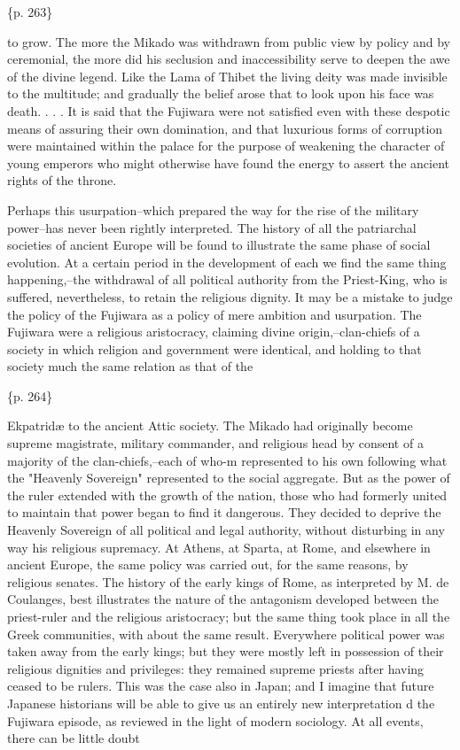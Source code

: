 \{p. 263\}

to grow. The more the Mikado was withdrawn from public view by policy and by ceremonial, the more did his seclusion and inaccessibility serve to deepen the awe of the divine legend. Like the Lama of Thibet the living deity was made invisible to the multitude; and gradually the belief arose that to look upon his face was death. . . . It is said that the Fujiwara were not satisfied even with these despotic means of assuring their own domination, and that luxurious forms of corruption were maintained within the palace for the purpose of weakening the character of young emperors who might otherwise have found the energy to assert the ancient rights of the throne.

Perhaps this usurpation--which prepared the way for the rise of the military power--has never been rightly interpreted. The history of all the patriarchal societies of ancient Europe will be found to illustrate the same phase of social evolution. At a certain period in the development of each we find the same thing happening,--the withdrawal of all political authority from the Priest-King, who is suffered, nevertheless, to retain the religious dignity. It may be a mistake to judge the policy of the Fujiwara as a policy of mere ambition and usurpation. The Fujiwara were a religious aristocracy, claiming divine origin,--clan-chiefs of a society in which religion and government were identical, and holding to that society much the same relation as that of the

\{p. 264\}

Ekpatridæ to the ancient Attic society. The Mikado had originally become supreme magistrate, military commander, and religious head by consent of a majority of the clan-chiefs,--each of who-m represented to his own following what the "Heavenly Sovereign" represented to the social aggregate. But as the power of the ruler extended with the growth of the nation, those who had formerly united to maintain that power began to find it dangerous. They decided to deprive the Heavenly Sovereign of all political and legal authority, without disturbing in any way his religious supremacy. At Athens, at Sparta, at Rome, and elsewhere in ancient Europe, the same policy was carried out, for the same reasons, by religious senates. The history of the early kings of Rome, as interpreted by M. de Coulanges, best illustrates the nature of the antagonism developed between the priest-ruler and the religious aristocracy; but the same thing took place in all the Greek communities, with about the same result. Everywhere political power was taken away from the early kings; but they were mostly left in possession of their religious dignities and privileges: they remained supreme priests after having ceased to be rulers. This was the case also in Japan; and I imagine that future Japanese historians will be able to give us an entirely new interpretation d the Fujiwara episode, as reviewed in the light of modern sociology. At all events, there can be little doubt

